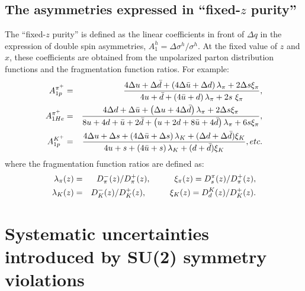 \subsection{The asymmetries expressed in  ``fixed-$z$ purity''} 
The ``fixed-$z$ purity'' is defined as the linear coefficients 
in front of $\Delta q$ in the 
expression of double spin asymmetries, $A_{1}^h=\Delta \sigma^h/\sigma^h$.
At the fixed value of $z$ and $x$, these coefficients are obtained from the
unpolarized parton distribution functions and the fragmentation function ratios.  
For example:
\begin{eqnarray}
A_{1p}^{\pi^+} & = & 
{  4\Delta u+ \Delta {\bar d} + \left( 4\Delta {\bar u} + \Delta d \right) 
 \lambda_{\pi} + 2 \Delta s  \xi_{\pi}
\over 4u  + {\bar d} + \left(4{\bar u} + d \right)  \lambda_{\pi} + 
2 s \ \xi_{\pi}},  \\
A_{1He}^{\pi^+} & = & 
{ 4 \Delta d+ \Delta {\bar u} + \left( \Delta u + 4 \Delta {\bar d} \right) 
 \lambda_{\pi} + 2 \Delta s  \xi_{\pi}
\over 8u  + 4d + {\bar u} +2 {\bar d} + \left(u + 2d+ 8{\bar u} + 4{\bar d} \right)  \lambda_{\pi} + 
6s \xi_{\pi}},  \\
A_{1p}^{K^+} & = & 
{  4\Delta u+ \Delta s + \left( 4\Delta {\bar u} + \Delta s \right) 
 \lambda_{K} + (\Delta d+\Delta \bar{d})  \xi_{K}
\over 4u  + s + \left(4{\bar u} + s \right)  \lambda_{K} + 
(d+\bar{d})  \xi_{K}}, etc. 
\end{eqnarray}
where the fragmentation function ratios are defined as:
\begin{eqnarray}
\lambda_{\pi}(z)  & = & D_{\pi}^-(z)/D_{\pi}^+(z), 
\hspace{1.0cm} \xi_{\pi}(z)=D_{s}^{\pi}(z)/D_{\pi}^+(z), \nonumber \\
\lambda_{K}(z) & = & D_{K}^-(z)/D_{K}^+(z),
\hspace{1.0cm} \xi_{K}(z)=D_{d}^{K}(z)/D_{K}^+(z).
\end{eqnarray}  
%
\section{Systematic uncertainties introduced by SU(2) symmetry 
violations }

